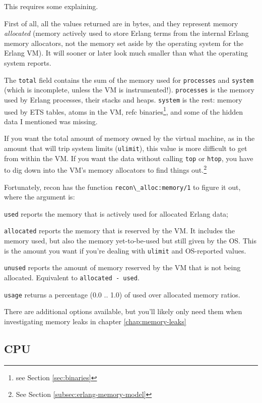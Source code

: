 \documentclass[11pt, oneside]{book}   	%
\newcommand{\app}[1]{\Verb`#1`}
\newcommand{\function}[1]{\Verb`#1`}
\newcommand{\expression}[1]{\Verb`#1`}
\begin{document}
This requires some explaining.

First of all, all the values returned are in bytes, and they represent memory \emph{allocated} (memory actively used to store Erlang terms from the internal Erlang memory allocators, not the memory set aside by the operating system for the Erlang VM). It will sooner or later look much smaller than what the operating system reports.

The \expression{total} field contains the sum of the memory used for \expression{processes} and \expression{system} (which is incomplete, unless the VM is instrumented!). \expression{processes} is the memory used by Erlang processes, their stacks and heaps. \expression{system} is the rest: memory used by ETS tables, atoms in the VM, refc binaries\footnote{see Section \ref{sec:binaries}}, and some of the hidden data I mentioned was missing.

If you want the total amount of memory owned by the virtual machine, as in the amount that will trip system limits (\app{ulimit}), this value is more difficult to get from within the VM. If you want the data without calling \app{top} or \app{htop}, you have to dig down into the VM's memory allocators to find things out.\footnote{See Section \ref{subsec:erlang-memory-model}}

Fortunately, recon has the function \function{recon\_alloc:memory/1} to figure it out, where the argument is:

\begin{itemize*}
	\item \expression{used} reports the memory that is actively used for allocated Erlang data;
   	\item \expression{allocated} reports the memory that is reserved by the VM. It includes the memory used, but also the memory yet-to-be-used but still given by the OS. This is the amount you want if you're dealing with \app{ulimit} and OS-reported values.
	\item \expression{unused} reports the amount of memory reserved by the VM that is not being allocated. Equivalent to \expression{allocated - used}.
	\item \expression{usage} returns a percentage (0.0 .. 1.0) of used over allocated memory ratios.
\end{itemize*}

There are additional options available, but you'll likely only need them when investigating memory leaks in chapter \ref{chap:memory-leaks}

\subsection{CPU}
\label{subsec:global-cpu}
\end{document}
